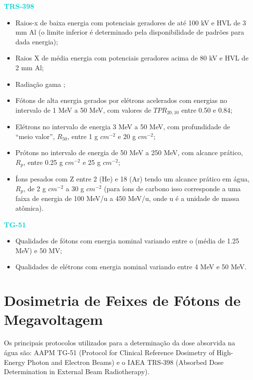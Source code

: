 \documentclass[11pt,a4paper]{article}
\newcounter{exemplo}
\begin{document}
	\begin{exemplo}
		\textcolor{DarkTurquoise}{\Large\LobsterTwo\textbf{TRS-398}}
		\begin{itemize}
			\item Raios-x de baixa energia com potenciais geradores de até 100 kV e HVL de 3 mm Al (o limite inferior é determinado pela disponibilidade de padrões para dada energia);
			\item Raios X de média energia com potenciais geradores acima de 80 kV e HVL de 2 mm Al;
			\item Radiação gama ;
			\item Fótons de alta energia gerados por elétrons acelerados com energias no intervalo de 1 MeV a 50 MeV, com valores de $TPR_{20,10}$ entre 0.50 e 0.84;
			\item Elétrons no intervalo de energia 3 MeV a 50 MeV, com profundidade de ``meio valor'', $R_{50}$, entre 1 g $cm^{-2}$ e 20 g $cm^{-2}$;
			\item Prótons no intervalo de energia de 50 MeV a 250 MeV, com alcance prático, $R_p$, entre 0.25 g $cm^{-2}$ e 25 g $cm^{-2}$;
			\item Íons pesados com Z entre 2 (He) e 18 (Ar) tendo um alcance prático em água, $R_p$, de 2 g $cm^{-2}$ a 30 g $cm^{-2}$ (para íons de carbono isso corresponde a uma faixa de energia de 100 MeV/u a 450 MeV/u, onde u é a unidade de massa atômica).
		\end{itemize}

		\textcolor{DarkTurquoise}{\Large\LobsterTwo\textbf{TG-51}}
		\begin{itemize}
			\item Qualidades de fótons com energia nominal variando entre o  (média de 1.25 MeV) e 50 MV;
			\item Qualidades de elétrons com energia nominal variando entre 4 MeV e 50 MeV. 
		\end{itemize}
		
	\end{exemplo}

    \section{Dosimetria de Feixes de Fótons de Megavoltagem}

    Os principais protocolos utilizados para a determinação da dose absorvida na água são: AAPM TG-51 (Protocol for Clinical Reference Dosimetry of High-Energy Photon and Electron Beams) e  o IAEA TRS-398 (Absorbed Dose Determination in External Beam Radiotherapy).  
\end{document}
